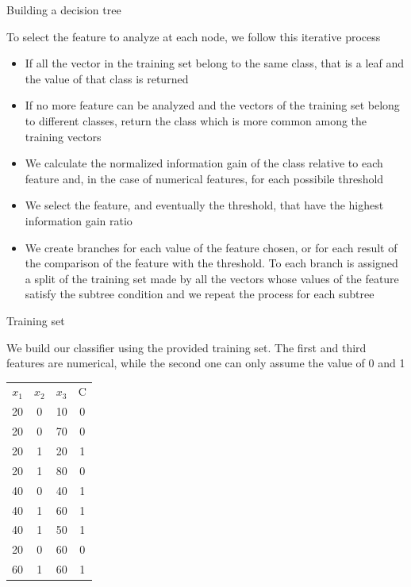 \begin{frame}{Building a decision tree}
	
To select the feature to analyze at each node, we follow this iterative process

\begin{itemize}
	
	\item If all the vector in the training set belong to the same class, that is a leaf and the value of that class is returned
	
	\item If no more feature can be analyzed and the vectors of the training set belong to different classes, return the class which is more common among the training vectors
	
	\item We calculate the normalized information gain of the class relative to each feature and, in the case of numerical features, for each possibile threshold
	
	\item We select the feature, and eventually the threshold, that have the highest information gain ratio
	
	\item We create branches for each value of the feature chosen, or for each result of the comparison of the feature with the threshold. To each branch is assigned a split of the training set made by all the vectors whose values of the feature satisfy the subtree condition and we repeat the process for each subtree
	

\end{itemize}

\end{frame}


\begin{frame}{Training set}
	
We build our classifier using the provided training set. The first and third features are numerical, while the second one can only assume the value of 0 and 1

\begin{center}
\begin{tabular}{c|c|c|c}
	$x_1$ & $x_2$ & $x_3$ & C \\
	20 & 0 & 10 & 0 \\
	20 & 0 & 70 & 0 \\
	20 & 1 & 20 & 1 \\
	20 & 1 & 80 & 0 \\
	40 & 0 & 40 & 1 \\
	40 & 1 & 60 & 1 \\
	40 & 1 & 50 & 1 \\
	20 & 0 & 60 & 0 \\
	60 & 1 & 60 & 1 \\

\end{tabular}
\end{center}
	

\end{frame}

